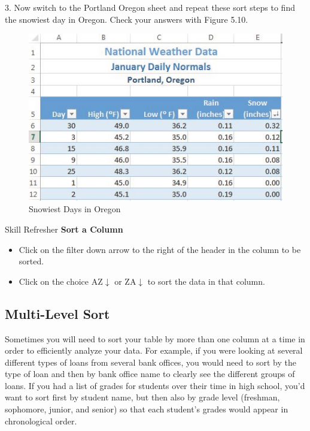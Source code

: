3. Now switch to the Portland Oregon sheet and repeat these sort steps to find the snowiest day in
Oregon. Check your answers with Figure 5.10.

\begin{figure}[H]
	\centering
	\includegraphics[width=\maxwidth{.95\linewidth}]{gfx/ch05_fig10}
	\caption{Snowiest Days in Oregon}
	\label{05:fig10}
\end{figure}



\begin{center}
	\begin{sklbox}{Skill Refresher}
		\textbf{Sort a Column}
		\\
		\begin{itemize}
			\setlength{\itemsep}{0pt}
			\setlength{\parskip}{0pt}
			\setlength{\parsep}{0pt}

			\item Click on the filter down arrow to the right of the header in the column to be sorted.
			\item Click on the choice AZ$ \downarrow $ or ZA$ \downarrow $ to sort the data in that column.
						
		\end{itemize}
	\end{sklbox}
\end{center}

\subsection{Multi-Level Sort}

Sometimes you will need to sort your table by more than one column at a time in order to efficiently
analyze your data. For example, if you were looking at several different types of loans from several
bank offices, you would need to sort by the type of loan and then by bank office name to clearly see
the different groups of loans. If you had a list of grades for students over their time in high school,
you’d want to sort first by student name, but then also by grade level (freshman, sophomore, junior,
and senior) so that each student’s grades would appear in chronological order.

